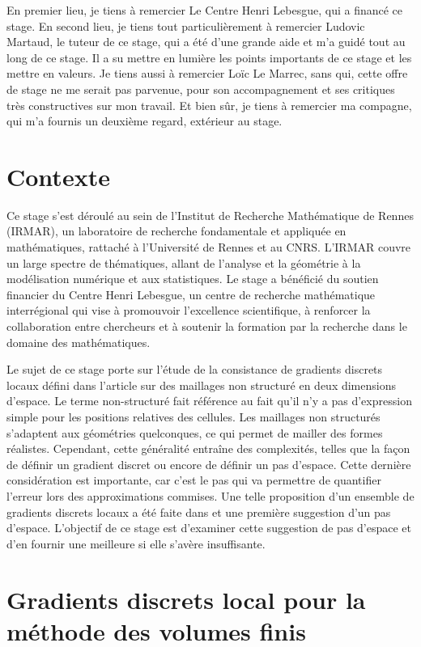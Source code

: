 \documentclass[12pt,a4paper]{article}
\begin{document}
	En premier lieu, je tiens à remercier Le Centre Henri Lebesgue, qui a financé ce stage. En second lieu, je tiens tout particulièrement à remercier Ludovic Martaud, le tuteur de ce stage, qui a été d'une grande aide et m'a guidé tout au long de ce stage. Il a su mettre en lumière les points importants de ce stage et les mettre en valeurs. Je tiens aussi à remercier Loïc Le Marrec, sans qui, cette offre de stage ne me serait pas parvenue, pour son accompagnement et ses critiques très constructives sur mon travail. Et bien sûr, je tiens à remercier ma compagne, qui m'a fournis un deuxième regard, extérieur au stage.
	
	\newpage
	\section{Contexte}
	
	Ce stage s'est déroulé au sein de l'Institut de Recherche Mathématique de Rennes (IRMAR), un
	laboratoire de recherche fondamentale et appliquée en mathématiques, rattaché à l'Université de Rennes et au CNRS. L'IRMAR couvre un large spectre de thématiques, allant de l'analyse et la géométrie à la modélisation numérique et aux statistiques. Le stage a bénéficié du soutien financier du Centre Henri Lebesgue, un centre de recherche mathématique interrégional qui vise à promouvoir l'excellence scientifique, à renforcer la collaboration entre chercheurs et à soutenir la formation par la recherche dans le domaine des mathématiques.
	\par Le sujet de ce stage porte sur l'étude de la consistance de gradients discrets locaux défini dans l'article \cite{ludo} sur des maillages non structuré en deux dimensions d'espace. Le terme non-structuré fait référence au fait qu'il n'y a pas d'expression simple pour les positions relatives des cellules. Les maillages non structurés s'adaptent aux géométries quelconques, ce qui permet de mailler des formes réalistes. Cependant, cette généralité entraîne des complexités, telles que la façon de définir un gradient discret ou encore de définir un pas d'espace. Cette dernière considération est importante, car c'est le pas qui va permettre de quantifier l'erreur lors des approximations commises. Une telle proposition d'un ensemble de gradients discrets locaux a été faite dans \cite{ludo} et une première suggestion d'un pas d'espace. L'objectif de ce stage est d'examiner cette suggestion de pas d'espace et d'en fournir une meilleure si elle s'avère insuffisante.
	
	\section{Gradients discrets local pour la méthode des volumes finis}\label{sec:notations}
	
\end{document}
